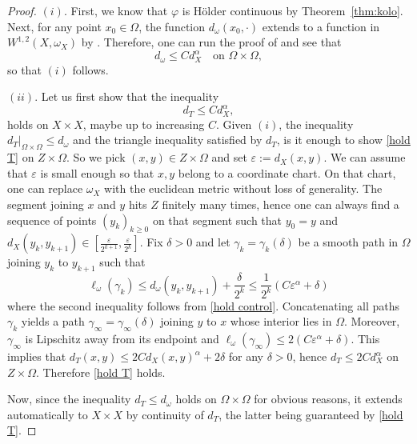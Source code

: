 \documentclass[a4paper,11pt,leqno,english]{smfart}
\theoremstyle{plain}
\theoremstyle{plain}
\numberwithin{equation}{section} %
\numberwithin{figure}{section} %
\theoremstyle{plain}
\theoremstyle{plain}
\theoremstyle{remark}
\theoremstyle{remark}
\theoremstyle{definition}
\theoremstyle{plain}
\theoremstyle{plain}
\theoremstyle{definition}
\newcommand{\ep}{\varepsilon}
\renewcommand{\ge}{\geq}
\renewcommand{\le}{\leq}
\begin{document}
\begin{proof}
$(i)$. First, we know that $\varphi$ is Hölder continuous by Theorem~\ref{thm:kolo}. Next, for any point $x_0\in \Omega$, the function $d_{\omega}(x_0, \cdot)$ extends to a function in $W^{1,2}(X,\omega_X)$ by \cite[Lemma~4.2]{GGZ25}. Therefore, one can run the proof of \cite[Proposition~1.4]{GGZ25} and see that
\begin{equation}
\label{hold control}
 d_{\omega} \le C d_X^\alpha \quad \mbox{on} \, \, \Omega \times \Omega,
\end{equation}
so that $(i)$ follows. 

$(ii)$. Let us first show that the inequality  
\begin{equation}
\label{hold T}
d_{T}\le Cd_X^{\alpha},
\end{equation}
holds on $X\times X$, maybe up to increasing $C$. Given $(i)$, the inequality $d_T|_{\Omega\times \Omega}\le d_\omega$ and the triangle inequality satisfied by $d_T$, is it enough to show \eqref{hold T} on $Z\times \Omega$. So we pick $(x,y)\in Z\times \Omega$ and set $\ep:=d_X(x,y)$. We can assume that $\ep$ is small enough so that $x,y$ belong to a coordinate chart. On that chart, one can replace $\omega_X$ with the euclidean metric without loss of generality. The segment joining $x$ and $y$ hits $Z$ finitely many times, hence one can always find a sequence of points $(y_k)_{k\ge 0}$ on that segment such that $y_0=y$ and $d_X(y_k,y_{k+1})\in[\frac{\ep}{2^{k+1}},\frac{\ep}{2^{k}}]$. Fix $\delta>0$ and let $\gamma_k=\gamma_k(\delta)$ be a smooth path in $\Omega$ joining $y_k$ to $y_{k+1}$ such that 
\[\ell_{\omega}(\gamma_k)\le d_{\omega}(y_k,y_{k+1})+\frac{\delta}{2^{k}}\le \frac{1}{2^k}(C\ep^\alpha+\delta)\]
where the second inequality follows from \eqref{hold control}. Concatenating all paths $\gamma_k$ yields a path $\gamma_\infty=\gamma_\infty(\delta)$ joining $y$ to $x$ whose interior lies in $\Omega$. Moreover, $\gamma_\infty$ is Lipschitz away from its endpoint and $\ell_{\omega}(\gamma_{\infty})\le 2(C\ep^\alpha+\delta)$. This implies that $d_{T}(x,y)\le 2Cd_X(x,y)^\alpha+2\delta$ for any $\delta>0$, hence $d_{T}\le 2Cd_X^\alpha$ on $Z\times \Omega$. Therefore \eqref{hold T} holds. 

Now, since the inequality $d_{T} \le d_{\omega}$ holds on $\Omega\times \Omega$ for obvious reasons, it extends automatically to $X\times X$ by continuity of $d_{T}$, the latter being guaranteed by \eqref{hold T}. 


\end{proof}
\end{document}
